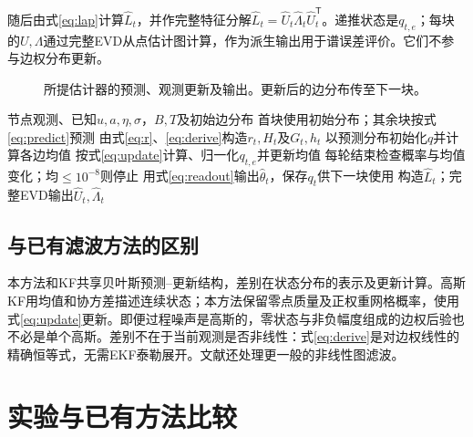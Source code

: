 \documentclass[journal]{IEEEtran}
\newcommand{\T}{\mathsf T}
\begin{document}
随后由式\eqref{eq:lap}计算$\hat L_t$，并作完整特征分解$\hat L_t=\hat U_t\hat\Lambda_t\hat U_t^\T$。递推状态是$q_{t,e}$；每块的$U,\Lambda$通过完整EVD从点估计图计算，作为派生输出用于谱误差评价。它们不参与边权分布更新。
\begin{figure}[t]
\centering
{}
\caption{所提估计器的预测、观测更新及输出。更新后的边分布传至下一块。}\label{fig:flow}
\end{figure}

\begin{algorithm}[t]
\caption{由节点信号递推估计动态图边权}\label{alg:main}
\begin{algorithmic}[1]\footnotesize
\Require 节点观测、已知$u,a,\eta,\sigma$，$B,T$及初始边分布
\State 首块使用初始分布；其余块按式\eqref{eq:predict}预测
\State 由式\eqref{eq:r}、\eqref{eq:derive}构造$r_t,H_t$及$G_t,h_t$
\State 以预测分布初始化$q$并计算各边均值
\State 按式\eqref{eq:update}计算、归一化$q_{t,e}$并更新均值
\State 每轮结束检查概率与均值变化；均$\leq10^{-8}$则停止
\EndFor
\State 用式\eqref{eq:readout}输出$\hat\theta_t$，保存$q_t$供下一块使用
\State 构造$\hat L_t$；完整EVD输出$\hat U_t,\hat\Lambda_t$
\EndFor
\end{algorithmic}\end{algorithm}

\subsection{与已有滤波方法的区别}
本方法和KF共享贝叶斯预测--更新结构，差别在状态分布的表示及更新计算。高斯KF用均值和协方差描述连续状态；本方法保留零点质量及正权重网格概率，使用式\eqref{eq:update}更新。即便过程噪声是高斯的，零状态与非负幅度组成的边权后验也不必是单个高斯。差别不在于当前观测是否非线性：式\eqref{eq:derive}是对边权线性的精确恒等式，无需EKF泰勒展开。文献\cite{dabush}还处理更一般的非线性图滤波。

\section{实验与已有方法比较}
\end{document}
